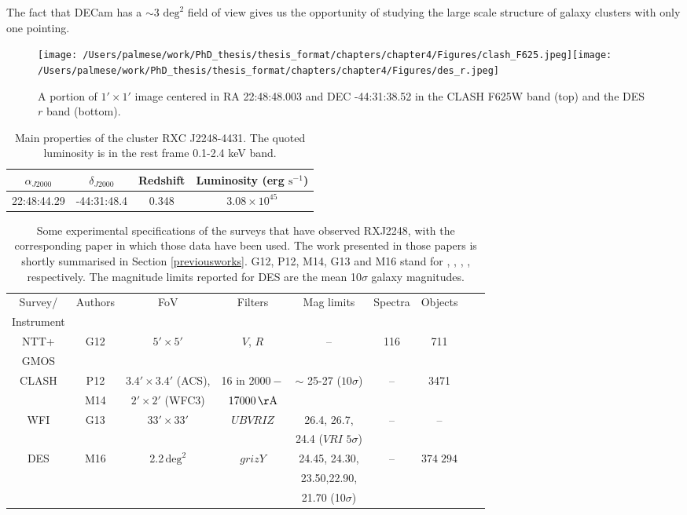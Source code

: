 {The fact that DECam has a $\sim 3$ $\textrm{deg}^2$ field of view gives us the opportunity of studying the large scale structure of galaxy clusters with only one pointing. 
\begin{figure}\centering
\texttt{[image: /Users/palmese/work/PhD\_thesis/thesis\_format/chapters/chapter4/Figures/clash\_F625.jpeg]}\texttt{[image: /Users/palmese/work/PhD\_thesis/thesis\_format/chapters/chapter4/Figures/des\_r.jpeg]}
\caption{A portion of $1'\times 1'$ image centered in RA 22:48:48.003 and DEC -44:31:38.52 in the CLASH F625W band (top) and the DES $r$ band (bottom).}\label{images}
\end{figure}
\begin{table}\centering
\begin{tabular}{cccc}
$\alpha_{J2000}$&$\delta_{J2000}$&Redshift& Luminosity (erg $\mathrm{s}^{-1}$)\\
\hline
22:48:44.29 &-44:31:48.4 & 0.348&$ 3.08 \times 10^{45}$
\\
\end{tabular}\caption{Main properties of the cluster RXC J2248-4431. The quoted luminosity is in the rest frame 0.1-2.4 keV band.}\label{properties}
\end{table}
\begin{table}
{\small
\centering
\begin{tabular}{c|cccccccc}
Survey/& Authors & FoV &Filters& Mag limits&Spectra&Objects\\
Instrument&&&&&&\\
\hline
NTT+&G12&$5'\times 5'$&$V$, $R$&--&116&711\\
GMOS&&&&&&\\
CLASH&P12&$3.4'\times3.4'$ (ACS), &16 in $2000-$&$\sim$ 25-27 ($10\sigma$)&-- &3471\\
& M14 &$2'\times2'$ (WFC3)&$17000\, \mathrm{\AA}$&&&\\
WFI&G13 &$33'\times 33'$& $UBVRIZ$&26.4, 26.7, &--&--\\
&&&&24.4 ($VRI$ $5\sigma$)&&&\\
DES & M16&2.2\,$\mathrm{deg}^2$&$grizY$& 24.45, 24.30,&--&$374\;294$\\
&&&&23.50,22.90,&&&\\
&&&&21.70 (10$\sigma$)&&&

\end{tabular}}\caption{Some experimental specifications of the surveys that have observed RXJ2248, with the corresponding paper in which those data have been used. The work presented in those papers is shortly summarised in Section \ref{previousworks}. G12, P12, M14, G13 and M16 stand for \citet{gomez}, \citet{postman}, \citet{monna}, \citet{gruen}, \citet{melchior} respectively. The magnitude limits reported for DES are the mean 10$\sigma$ galaxy magnitudes.}\label{surveys}
\end{table}

}
